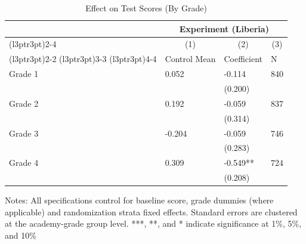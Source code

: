 \begin{table}[!h]
\centering
\caption{Effect on Test Scores (By Grade)}
\centering
\begin{threeparttable}
\begin{tabular}[t]{llll}
\toprule
\multicolumn{1}{c}{ } & \multicolumn{3}{c}{Experiment (Liberia)} \\
\cmidrule(l{3pt}r{3pt}){2-4}
\multicolumn{1}{c}{ } & \multicolumn{1}{c}{(1)} & \multicolumn{1}{c}{(2)} & \multicolumn{1}{c}{(3)} \\
\cmidrule(l{3pt}r{3pt}){2-2} \cmidrule(l{3pt}r{3pt}){3-3} \cmidrule(l{3pt}r{3pt}){4-4}
 & Control Mean & Coefficient & N\\
\midrule
Grade 1 & 0.052 & -0.114 & 840\\
 &  & (0.200) & \\
Grade 2 & 0.192 & -0.059 & 837\\
 &  & (0.314) & \\
Grade 3 & -0.204 & -0.059 & 746\\
 &  & (0.283) & \\
Grade 4 & 0.309 & -0.549** & 724\\
 &  & (0.208) & \\
\bottomrule
\end{tabular}
\begin{tablenotes}[para]
\item Notes: All specifications control for baseline score, grade dummies (where applicable) and randomization strata fixed effects. Standard errors are clustered at the academy-grade group level. ***, **, and * indicate significance at 1\%, 5\%, and 10\%
\end{tablenotes}
\end{threeparttable}
\end{table}
